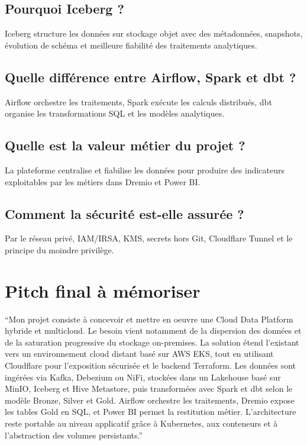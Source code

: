 \documentclass[11pt,a4paper]{article}
\newcommand{\important}[1]{%
  \vspace{0.25cm}
  \noindent
  \colorbox{softblue}{%
    \parbox{\dimexpr\textwidth-2\fboxsep\relax}{#1}%
  }
  \vspace{0.2cm}
}
\begin{document}
\subsection*{Pourquoi Iceberg ?}
Iceberg structure les données sur stockage objet avec des métadonnées, snapshots, évolution de schéma et meilleure fiabilité des traitements analytiques.

\subsection*{Quelle différence entre Airflow, Spark et dbt ?}
Airflow orchestre les traitements, Spark exécute les calculs distribués, dbt organise les transformations SQL et les modèles analytiques.

\subsection*{Quelle est la valeur métier du projet ?}
La plateforme centralise et fiabilise les données pour produire des indicateurs exploitables par les métiers dans Dremio et Power BI.

\subsection*{Comment la sécurité est-elle assurée ?}
Par le réseau privé, IAM/IRSA, KMS, secrets hors Git, Cloudflare Tunnel et le principe du moindre privilège.

\section{Pitch final à mémoriser}

\important{
``Mon projet consiste à concevoir et mettre en oeuvre une Cloud Data Platform hybride et multicloud. Le besoin vient notamment de la dispersion des données et de la saturation progressive du stockage on-premises. La solution étend l'existant vers un environnement cloud distant basé sur AWS EKS, tout en utilisant Cloudflare pour l'exposition sécurisée et le backend Terraform. Les données sont ingérées via Kafka, Debezium ou NiFi, stockées dans un Lakehouse basé sur MinIO, Iceberg et Hive Metastore, puis transformées avec Spark et dbt selon le modèle Bronze, Silver et Gold. Airflow orchestre les traitements, Dremio expose les tables Gold en SQL, et Power BI permet la restitution métier. L'architecture reste portable au niveau applicatif grâce à Kubernetes, aux conteneurs et à l'abstraction des volumes persistants.''
}
\end{document}
